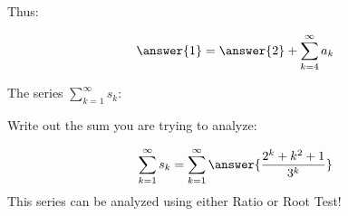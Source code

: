 \documentclass{ximera}
\begin{document}
\begin{exercise}
\begin{exercise}
\begin{exercise}
\begin{exercise}
Thus:

\[
\answer{1} = \answer{2} + \sum_{k=4}^{\infty} a_k
\]
\begin{exercise}
The series $\sum_{k=1}^{\infty} s_k$: 

\begin{multipleChoice}
\end{multipleChoice}

\begin{hint}
Write out the sum you are trying to analyze:

\[
\sum_{k=1}^{\infty} s_k = \sum_{k=1}^{\infty} \answer{\frac{2^k+k^2+1}{3^k}}
\]
This series can be analyzed using either Ratio or Root Test!

\end{hint}
\end{exercise}
\end{exercise}
\end{exercise}
\end{exercise}
\end{exercise}
\end{document}

